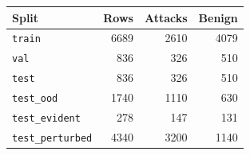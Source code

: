 \begin{tabular}{@{}lrrr@{}}
\toprule
Split & Rows & Attacks & Benign \\
\midrule
\texttt{train} & 6689 & 2610 & 4079 \\
\texttt{val} & 836 & 326 & 510 \\
\texttt{test} & 836 & 326 & 510 \\
\texttt{test\_ood} & 1740 & 1110 & 630 \\
\texttt{test\_evident} & 278 & 147 & 131 \\
\texttt{test\_perturbed} & 4340 & 3200 & 1140 \\
\bottomrule
\end{tabular}
